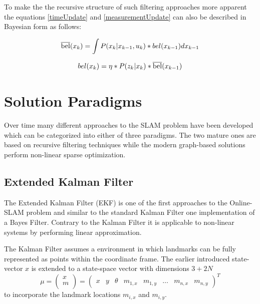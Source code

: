 To make the the recursive structure of such filtering approaches more apparent the equations \ref{timeUpdate} and \ref{measurementUpdate} can also be described in Bayesian form as follows:

\begin{equation}\label{timeUpdateBayes}
	\overline{\rm bel}(x_{k}) = \int P(x_{k} | x_{k-1}, u_{k}) * bel(x_{k-1}) dx_{k-1}
\end{equation}


\begin{equation}\label{measurementUpdateBayes}
	bel(x_{k}) = \eta * P(z_{k} | x_{k}) * \overline{\rm bel}(x_{k-1})
\end{equation}

\section{Solution Paradigms} 
Over time many different approaches to the SLAM problem have been developed which can be categorized into either of three paradigms. The two mature ones are based on recursive filtering techniques while the modern graph-based solutions perform non-linear sparse optimization.

\subsection{Extended Kalman Filter}
The Extended Kalman Filter (EKF) is one of the first approaches to the Online-SLAM problem and similar to the standard Kalman Filter one implementation of a Bayes Filter. Contrary to the Kalman Filter it is applicable to non-linear systems by performing linear approximation.


The Kalman Filter assumes a environment in which landmarks can be fully represented as points within the coordinate frame. The earlier introduced state-vector $ x $ is extended to a state-space vector with dimensions $ 3 + 2N$
\[ \mu = 
\begin{pmatrix}
	x \\
	m \\
\end{pmatrix}
=
\begin{pmatrix}
	x & y & \theta & m_{1, x} & m_{1, y} & \dots & m_{n, x} & m_{n, y} 
\end{pmatrix} ^{T}
\] 
to incorporate the landmark locations $ m_{i, x} $ and $ m_{i, y} $. 

